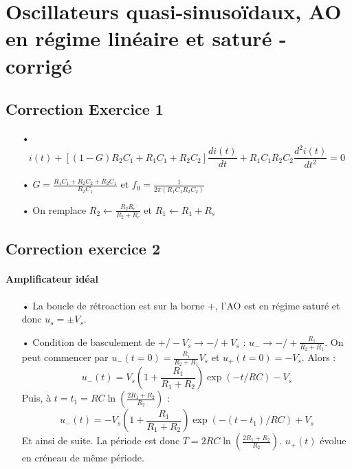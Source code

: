 \documentclass{report}
\begin{document}
\chapter*{Oscillateurs quasi-sinusoïdaux, AO en régime linéaire et saturé - corrigé}

\newpage

\section*{Correction Exercice 1}

\begin{itemize}
	\item[•] 
	\begin{equation}
		i(t) + \left[(1-G)R_2C_1 +R_1C_1+R_2C_2\right]\frac{di(t)}{dt}+R_1C_1R_2C_2\frac{d^2i(t)}{dt^2}=0 
	\end{equation}
	\item[•]  $G=\frac{R_1C_1+R_2C_2+R_2C_1}{R_2C_1}$ et $f_0=\frac{1}{2\pi(R_1C_1R_2C_2)}$
	\item[•] On remplace $R_2\leftarrow\frac{R_2R_e}{R_2+R_e}$ et $R_1\leftarrow R_1+R_s$
\end{itemize}

\section*{Correction exercice 2}

\subsubsection{Amplificateur idéal}


\begin{itemize}
	\item[•] La boucle de rétroaction est sur la borne +, l'AO est en régime saturé et donc $u_s=\pm V_s$. 
	\item[•] Condition de basculement de $+/-V_s\rightarrow-/+V_s$ : $u_-\rightarrow-/+\frac{R_1}{R_2+R_1}$.
	On peut commencer par $u_-(t=0)=\frac{R_1}{R_2+R_1}V_s$ et $u_+(t=0)=-V_s$. Alors :
	\begin{equation}
		u_-(t)=V_s\left(1+\frac{R_1}{R_1+R_2}\right)\exp(-t/RC)-V_s 
	\end{equation}
Puis, à $t=t_1=RC\ln\left(\frac{2R_1+R_2}{R_2} \right)$ :
	\begin{equation}
		u_-(t)=-V_s\left(1+\frac{R_1}{R_1+R_2}\right)\exp(-(t-t_1)/RC)+V_s 
	\end{equation}
Et ainsi de suite. La période est donc $T = 2RC\ln\left(\frac{2R_1+R_2}{R_2} \right)$. $u_+(t)$ évolue en créneau de même période. 
\end{itemize}
\end{document}
